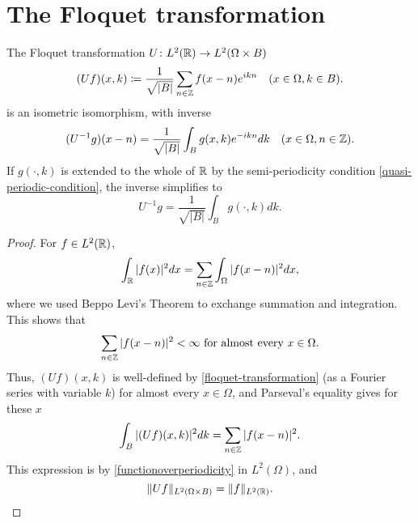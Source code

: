 \section{The Floquet transformation} 	
\begin{theorem} \label{3.2:thm-UIsometricIsomorphism}
	The Floquet transformation $U \colon L^{2}(\mathbb{R}) \rightarrow L^{2}(\Omega \times B)$ 
	\begin{equation}
		(Uf)(x, k) \coloneqq \frac{1}{\sqrt{|B|}} \sum_{n \in \mathbb{Z}} f(x - n) e^{ikn} \quad (x \in \Omega, k \in B). \label{floquet-transformation}
	\end{equation}
	is an isometric isomorphism, with inverse
		\begin{equation}
			(U^{-1}g)(x - n) = \frac{1}{\sqrt{|B|}} \int_{B} g(x, k) e^{-ikn} dk \quad (x \in \Omega, n \in \mathbb{Z}). \label{3.8}
		\end{equation} 
	If $g(\cdot, k)$ is extended to the whole of $\mathbb{R}$ by the semi-periodicity condition \eqref{quasi-periodic-condition}, the inverse simplifies to
		\begin{equation}
			U^{-1} g = \frac{1}{\sqrt{|B|}} \int_{B} g(\cdot, k) dk. \label{3.9}
		\end{equation}
		
	\begin{proof}
		For $f \in L^{2}(\mathbb{R})$,
		\begin{equation}
			\int_{\mathbb{R}} |f(x)|^{2} dx = \sum_{n \in \mathbb{Z}} \int_{\Omega} |f(x - n)|^{2} dx,\label{functionoverperiodicity}
		\end{equation} 
		where we used Beppo Levi's Theorem to exchange summation and integration. This shows that
		\[ \sum_{n \in \mathbb{Z}} |f(x - n)|^{2} < \infty \text{ for almost every } x \in \Omega.\]
		Thus, $(Uf)(x, k)$ is well-defined by \eqref{floquet-transformation} (as a Fourier series with variable $k$) for almost every $x \in \Omega$, and Parseval's equality gives for these $x$
		\[ \int_{B}|(Uf)(x,k)|^{2} dk = \sum_{n \in \mathbb{Z}} |f(x - n)|^{2}. \]
	 	This expression is by \eqref{functionoverperiodicity} in $L^{2}(\Omega)$, and
		\[ \| Uf \|_{L^{2}(\Omega \times B)} = \|f\|_{L^{2}(\mathbb{R})}. \]
		

\end{proof}
\end{theorem}
